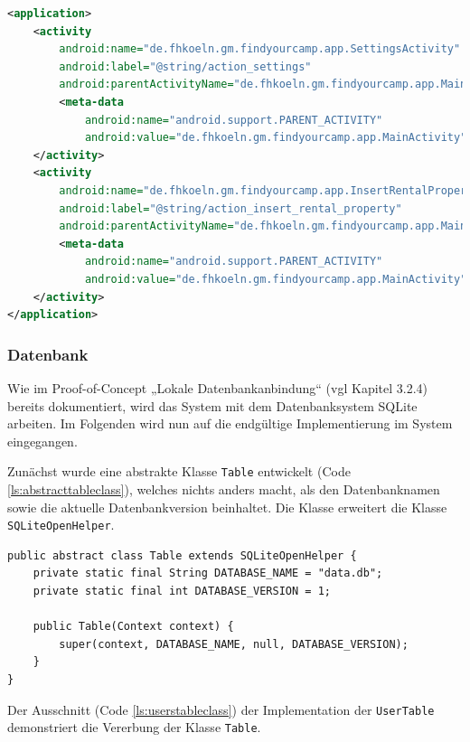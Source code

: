 \begin{lstlisting}[label=ls:activities,caption=Deklaration zweier Activities mit Referenz zu einer übergeordneten Activity,language=xml]
<application>
    <activity
        android:name="de.fhkoeln.gm.findyourcamp.app.SettingsActivity"
        android:label="@string/action_settings"
        android:parentActivityName="de.fhkoeln.gm.findyourcamp.app.MainActivity" >
        <meta-data
            android:name="android.support.PARENT_ACTIVITY"
            android:value="de.fhkoeln.gm.findyourcamp.app.MainActivity" />
    </activity>
    <activity
        android:name="de.fhkoeln.gm.findyourcamp.app.InsertRentalPropertyActivity"
        android:label="@string/action_insert_rental_property"
        android:parentActivityName="de.fhkoeln.gm.findyourcamp.app.MainActivity" >
        <meta-data
            android:name="android.support.PARENT_ACTIVITY"
            android:value="de.fhkoeln.gm.findyourcamp.app.MainActivity" />
    </activity>
</application>
\end{lstlisting}

\subsubsection{Datenbank}

Wie im Proof-of-Concept „Lokale Datenbankanbindung“ (vgl Kapitel 3.2.4) bereits dokumentiert, wird das System mit dem Datenbanksystem SQLite arbeiten. Im Folgenden wird nun auf die endgültige Implementierung im System eingegangen.

Zunächst wurde eine abstrakte Klasse \texttt{Table} entwickelt (Code \ref{ls:abstracttableclass}), welches nichts anders macht, als den Datenbanknamen sowie die aktuelle Datenbankversion beinhaltet. Die Klasse erweitert die Klasse \texttt{SQLiteOpenHelper}.

\begin{lstlisting}[label=ls:abstracttableclass,caption=Abstrakte Klasse \texttt{Table}]
public abstract class Table extends SQLiteOpenHelper {
	private static final String DATABASE_NAME = "data.db";
	private static final int DATABASE_VERSION = 1;

	public Table(Context context) {
		super(context, DATABASE_NAME, null, DATABASE_VERSION);
	}
}
\end{lstlisting}

Der Ausschnitt (Code \ref{ls:userstableclass}) der Implementation der \texttt{UserTable} demonstriert die Vererbung der Klasse \texttt{Table}.

